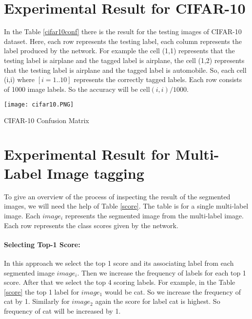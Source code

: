 \section{Experimental Result for CIFAR-10}

In the Table \ref{cifar10conf} there is the result for the testing images of CIFAR-10 dataset. Here, each row represents the testing label, each column represents the label produced by the network. For example the cell (1,1) represents that the testing label is airplane and the tagged label is airplane, the cell (1,2) represents that the testing label is airplane and the tagged label is automobile. So, each cell (i,i) where $[i = 1..10]$ represents the correctly tagged labels. Each row consists of 1000 image labels. So the accuracy will be cell$(i,i)/1000$.



\begin{table}[!htb] 
 \centering
  \texttt{[image: cifar10.PNG]}
  \caption{CIFAR-10 Confusion Matrix}
  \label{cifar10conf}
\end{table}


\section{Experimental Result for Multi-Label Image tagging}
To give an overview of the process of inspecting the result of the segmented images, we will need the help of Table \ref{score}. The table is for a single multi-label image. Each $image_{i}$ represents the segmented image from the multi-label image. Each row represents the class scores given by the network. 

\paragraph{Selecting Top-1 Score:}
In this approach we select the top 1 score and its associating label from each segmented image $image_{i}$. Then we increase the frequency of labels for each top 1 score. After that we select the top 4 scoring labels. For example, in the Table \ref{score} the top 1 label for $image_{1}$ would be cat. So we increase the frequency of cat by 1. Similarly for $image_{2}$ again the score for label cat is highest. So frequency of cat will be increased by 1.

